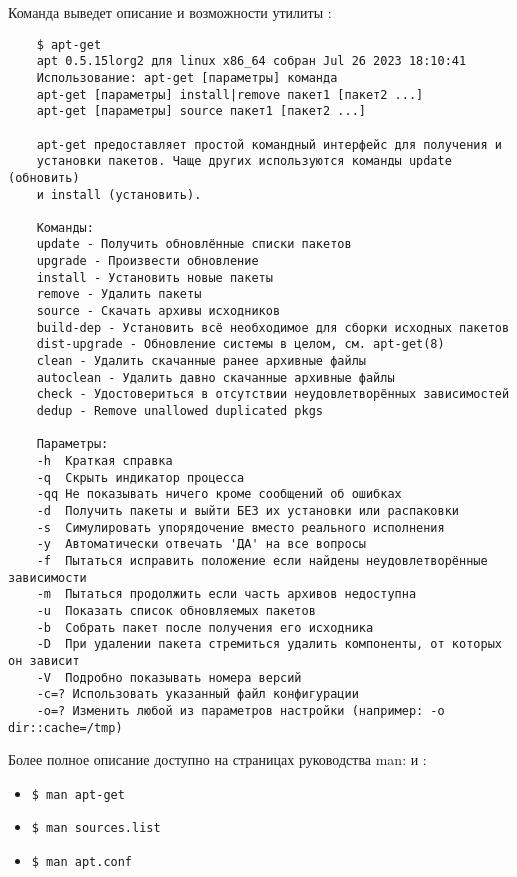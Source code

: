 Команда  выведет описание и возможности утилиты :
\begin{verbatim}
	$ apt-get
	apt 0.5.15lorg2 для linux x86_64 собран Jul 26 2023 18:10:41
	Использование: apt-get [параметры] команда
	apt-get [параметры] install|remove пакет1 [пакет2 ...]
	apt-get [параметры] source пакет1 [пакет2 ...]
	
	apt-get предоставляет простой командный интерфейс для получения и
	установки пакетов. Чаще других используются команды update (обновить)
	и install (установить).
	
	Команды:
	update - Получить обновлённые списки пакетов
	upgrade - Произвести обновление
	install - Установить новые пакеты
	remove - Удалить пакеты
	source - Скачать архивы исходников
	build-dep - Установить всё необходимое для сборки исходных пакетов
	dist-upgrade - Обновление системы в целом, см. apt-get(8)
	clean - Удалить скачанные ранее архивные файлы
	autoclean - Удалить давно скачанные архивные файлы
	check - Удостовериться в отсутствии неудовлетворённых зависимостей
	dedup - Remove unallowed duplicated pkgs
	
	Параметры:
	-h  Краткая справка
	-q  Скрыть индикатор процесса
	-qq Не показывать ничего кроме сообщений об ошибках
	-d  Получить пакеты и выйти БЕЗ их установки или распаковки
	-s  Симулировать упорядочение вместо реального исполнения
	-y  Автоматически отвечать 'ДА' на все вопросы
	-f  Пытаться исправить положение если найдены неудовлетворённые зависимости
	-m  Пытаться продолжить если часть архивов недоступна
	-u  Показать список обновляемых пакетов
	-b  Собрать пакет после получения его исходника
	-D  При удалении пакета стремиться удалить компоненты, от которых он зависит
	-V  Подробно показывать номера версий
	-c=? Использовать указанный файл конфигурации
	-o=? Изменить любой из параметров настройки (например: -o dir::cache=/tmp)
\end{verbatim}

	Более полное описание доступно на страницах руководства man:
	 и :
\begin{itemize}
	\item\begin{verbatim}$ man apt-get\end{verbatim}
	\item\begin{verbatim}$ man sources.list\end{verbatim}
	\item\begin{verbatim}$ man apt.conf\end{verbatim}
\end{itemize}

